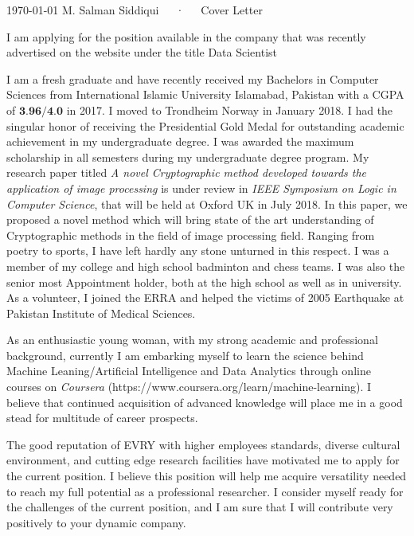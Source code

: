 \documentclass[11pt, a4paper]{awesome-cv}
\begin{document}
	
	\makecvheader
	
	\makecvfooter
	{\today}
	{M. Salman Siddiqui~~~·~~~Cover Letter}
	{}
	
	\makelettertitle
	
	\begin{cvletter}
		
		
		I am applying for the position available in the company that was recently advertised on the website under the title Data Scientist
		
		I am a fresh graduate and have recently received my Bachelors in Computer Sciences from International Islamic University Islamabad, Pakistan with a CGPA of $\textbf{3.96/4.0}$ in 2017. I moved to Trondheim Norway in January 2018. 
 I had the singular honor of receiving the Presidential Gold Medal for outstanding academic achievement in my undergraduate degree. I was awarded the maximum scholarship in all semesters during my undergraduate degree program.	My research paper titled \emph{A novel Cryptographic method developed towards the application of image processing} is under review in \emph{IEEE Symposium on Logic in Computer Science}, that will be held at Oxford UK in July 2018. In this paper, we proposed a novel method which will bring state of the art understanding of Cryptographic methods in the field of image processing field.  Ranging from poetry to sports, I have left hardly any stone unturned in this respect. I was a member of my college and high school badminton and chess teams. I was also the senior most Appointment holder, both at the high school as well as in university. As a volunteer, I joined the ERRA and helped the victims of 2005 Earthquake at Pakistan Institute of Medical Sciences.
 
 As an enthusiastic young woman, with my strong academic and professional background, currently I am embarking myself to learn the science behind Machine Leaning/Artificial Intelligence and Data Analytics through online courses on \emph{Coursera} (https://www.coursera.org/learn/machine-learning). I believe that continued acquisition of advanced knowledge will place me in a good stead for  multitude of career prospects. 

	  
The good reputation of EVRY with higher employees standards, diverse cultural environment, and cutting edge research facilities have motivated me to apply for the current position. I believe this position will help me acquire versatility needed to reach my full potential as a professional researcher. I consider myself ready for the challenges of the current position, and I am sure that I will contribute very positively to your dynamic company.
	\end{cvletter}
	
	
	\makeletterclosing
	
\end{document}
